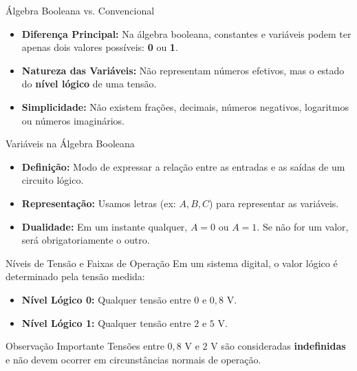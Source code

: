 
\begin{frame}{Álgebra Booleana vs. Convencional}
    \begin{itemize}
        \item \textbf{Diferença Principal:} Na álgebra booleana, constantes e variáveis podem ter apenas dois valores possíveis: \textbf{0} ou \textbf{1}.
        \item \textbf{Natureza das Variáveis:} Não representam números efetivos, mas o estado do \textbf{nível lógico} de uma tensão.
        \item \textbf{Simplicidade:} Não existem frações, decimais, números negativos, logaritmos ou números imaginários.
    \end{itemize}
\end{frame}

\begin{frame}{Variáveis na Álgebra Booleana}
    \begin{itemize}
        \item \textbf{Definição:} Modo de expressar a relação entre as entradas e as saídas de um circuito lógico.
        \item \textbf{Representação:} Usamos letras (ex: $A, B, C$) para representar as variáveis.
        \item \textbf{Dualidade:} Em um instante qualquer, $A = 0$ ou $A = 1$. Se não for um valor, será obrigatoriamente o outro.
    \end{itemize}
\end{frame}


\begin{frame}{Níveis de Tensão e Faixas de Operação}
    Em um sistema digital, o valor lógico é determinado pela tensão medida:
    \begin{itemize}
        \item \textbf{Nível Lógico 0:} Qualquer tensão entre $0$ e $0,8$ V.
        \item \textbf{Nível Lógico 1:} Qualquer tensão entre $2$ e $5$ V.
    \end{itemize}
    \vspace{0.3cm}
    \begin{block}{Observação Importante}
        Tensões entre $0,8$ V e $2$ V são consideradas \textbf{indefinidas} e não devem ocorrer em circunstâncias normais de operação.
    \end{block}
\end{frame}

